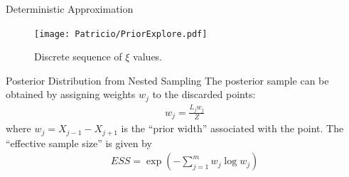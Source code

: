 \begin{frame}{Deterministic Approximation}
\begin{figure}[]    		
		\texttt{[image: Patricio/PriorExplore.pdf]}
		\caption{Discrete sequence of $\xi$ values.}
\end{figure}
\end{frame}
\begin{frame}[t]{Posterior Distribution from Nested Sampling}
The posterior sample can be obtained by assigning weights $w_j$ to the
discarded points:
\begin{align*}
w_{j} = \frac{L_{j} w_{j}}{Z} 
\end{align*}
where $w_{j}=X_{j-1} - X_{j+1}$ is the ``prior width'' associated with the
point. The ``effective sample size'' is given by
\begin{align*}
ESS = \exp \left( - \sum_{j=1}^{m} w_j \log w_j \right)
\end{align*}

\end{frame}


